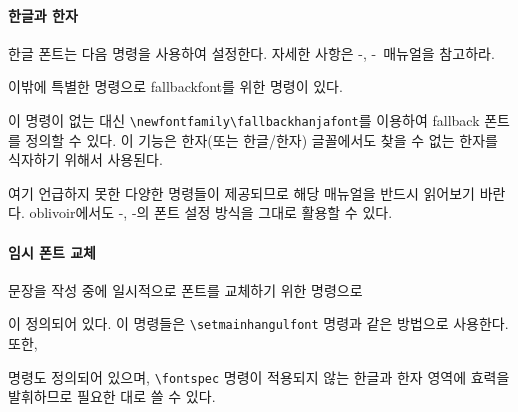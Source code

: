 \documentclass[
	12pt,
	a4paper,
	kosection,
	footnote,
	microtype,
	figtabcapt,
]{oblivoir}
\def\cs#1{\texttt{\textbackslash #1}}
\def\xetexko{\XeTeX-\ko}
\def\luatexko{\LuaTeX-\ko}
\begin{document}
\paragraph{한글과 한자}
한글 폰트는 다음 명령을 사용하여 설정한다. 자세한 사항은 \xetexko, \luatexko\ 매뉴얼을 참고하라.
\begin{boxedverbatim}
\end{boxedverbatim}

이밖에 특별한 명령으로  fallbackfont를 위한 명령이 있다.
\begin{boxedverbatim}
\setmainfallbackfont
\setsansfallbackfont
\setmonofallbackfont
\end{boxedverbatim}
 이 명령이 없는 대신 \cs{newfontfamily}\cs{fallbackhanjafont}를 이용하여
fallback 폰트를 정의할 수 있다. 이 기능은 한자(또는 한글/한자) 글꼴에서도 찾을 수 없는 한자를
식자하기 위해서 사용된다.

여기 언급하지 못한 다양한 명령들이 제공되므로 해당 매뉴얼을 반드시 읽어보기 바란다.
oblivoir에서도 \xetexko, \luatexko 의 폰트 설정 방식을 그대로 활용할 수 있다.

%

\paragraph{임시 폰트 교체}
문장을 작성 중에 일시적으로 폰트를 교체하기 위한 명령으로 
\begin{boxedverbatim}
\adhochangulfont
\adhochanjafont
\end{boxedverbatim}
이 정의되어 있다. 이 명령들은 \verb|\setmainhangulfont| 명령과 같은 방법으로 사용한다. 또한, 
\begin{boxedverbatim}
\hangulfontspec
\hanjafontspec
\end{boxedverbatim}
명령도 정의되어 있으며, \verb|\fontspec| 명령이 적용되지 않는 한글과 한자 영역에 효력을 발휘하므로 필요한 대로 쓸 수 있다.
\end{document}
